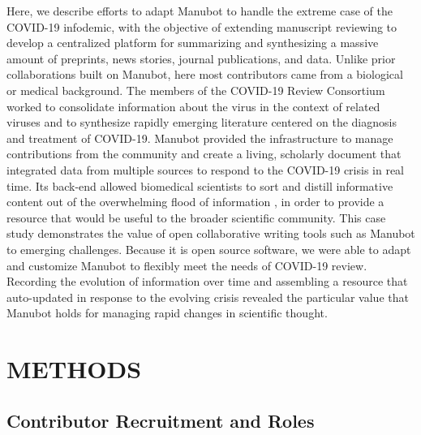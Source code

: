 \documentclass[sigconf]{acmart}
\begin{document}
Here, we describe efforts to adapt Manubot to handle the extreme case of the COVID-19 infodemic, with the objective of extending manuscript reviewing to develop a centralized platform for summarizing and synthesizing a massive amount of preprints, news stories, journal publications, and data.
Unlike prior collaborations built on Manubot, here most contributors came from a biological or medical background.
The members of the COVID-19 Review Consortium worked to consolidate information about the virus in the context of related viruses and to synthesize rapidly emerging literature centered on the diagnosis and treatment of COVID-19.
Manubot provided the infrastructure to manage contributions from the community and create a living, scholarly document that integrated data from multiple sources to respond to the COVID-19 crisis in real time.
Its back-end allowed biomedical scientists to sort and distill informative content out of the overwhelming flood of information \citep{1HZeeO4Cs}, in order to provide a resource that would be useful to the broader scientific community.
This case study demonstrates the value of open collaborative writing tools such as Manubot to emerging challenges.
Because it is open source software, we were able to adapt and customize Manubot to flexibly meet the needs of COVID-19 review.
Recording the evolution of information over time and assembling a resource that auto-updated in response to the evolving crisis revealed the particular value that Manubot holds for managing rapid changes in scientific thought.

\hypertarget{methods}{%
\section{METHODS}\label{methods}}

\hypertarget{contributor-recruitment-and-roles}{%
\subsection{Contributor Recruitment and Roles}\label{contributor-recruitment-and-roles}}
\end{document}
